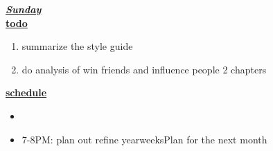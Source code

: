 \underline{\textbf{\textit{Sunday}}}\\
\underline{\textbf{todo}}\\
\begin{enumerate}
\item summarize the style guide 
\item do analysis of win friends and influence people 2 chapters 
\end{enumerate}

\underline{\textbf{schedule}}\\
\begin{itemize}
\item
\item 7-8PM: plan out refine yearweeksPlan for the next month
\end{itemize}

\newpage

